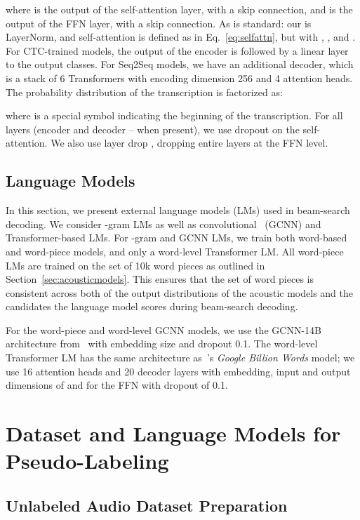 \documentclass{article}
\begin{document}
where  is the output of the self-attention layer, with a skip connection, and  is the output of the FFN layer, with a skip connection. As is standard: our  is LayerNorm, and self-attention is defined as in Eq.~\ref{eq:selfattn}, but with , , and .
For CTC-trained models, the output of the encoder  is followed by a linear layer to the output classes.
For Seq2Seq models, we have an additional decoder, which is a stack of 6 Transformers with encoding dimension 256 and 4 attention heads. The probability distribution of the transcription is factorized as:

where  is a special symbol indicating the beginning of the transcription. For all layers (encoder and decoder -- when present), we use dropout on the self-attention. We also use layer drop \cite{fan2019reducing}, dropping entire layers at the FFN level.

\subsection{Language Models}
\label{sec:languagemodels}

In this section, we present external language models (LMs) used in beam-search decoding. We consider -gram LMs as well as convolutional~\cite{dauphin2017gcnn} (GCNN) and Transformer-based LMs. For -gram and GCNN LMs, we train both word-based and word-piece models, and only a word-level Transformer LM. All word-piece LMs are trained on the set of 10k word pieces as outlined in Section~\ref{sec:acousticmodels}. This ensures that the set of word pieces is consistent across both of the output distributions of the acoustic models and the candidates the language model scores during beam-search decoding.

For the word-piece and word-level GCNN models, we use the GCNN-14B architecture from~\cite{dauphin2017gcnn} with embedding size  and dropout 0.1. The word-level Transformer LM has the same architecture as~\cite{baevski2018adaptive}'s \textit{Google Billion Words} model; we use 16 attention heads and 20 decoder layers with embedding, input and output dimensions of  and  for the FFN with dropout of 0.1.

\section{Dataset and Language Models for Pseudo-Labeling}
\label{sec:librivoxdataset}

\subsection{Unlabeled Audio Dataset Preparation}
\label{sec:librivoxdatasetprep}
\end{document}
